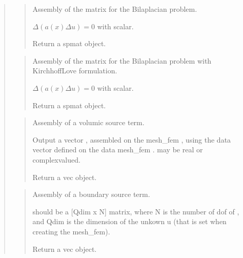 \documentclass[a4paper,11pt,english]{sphinxmanual}
\begin{document}
\begin{quote}
\begin{quote}
Assembly of the matrix for the Bilaplacian problem.

\(\Delta(a(x)\Delta u) = 0\)   with  scalar.

Return a spmat object.
\end{quote}

\begin{quote}

Assembly of the matrix for the Bilaplacian problem with Kirchhoff\sphinxhyphen{}Love formulation.

\(\Delta(a(x)\Delta u) = 0\)   with  scalar.

Return a spmat object.
\end{quote}

\begin{quote}

Assembly of a volumic source term.

Output a vector , assembled on the mesh\_fem , using the data
vector  defined on the data mesh\_fem .  may be real or
complex\sphinxhyphen{}valued.

Return a vec object.
\end{quote}

\begin{quote}

Assembly of a boundary source term.

 should be a {[}Qdim x N{]} matrix, where N is the number of dof
of , and Qdim is the dimension of the unkown u (that is set
when creating the mesh\_fem).

Return a vec object.
\end{quote}

\begin{quote}


\end{quote}
\end{quote}
\end{document}
